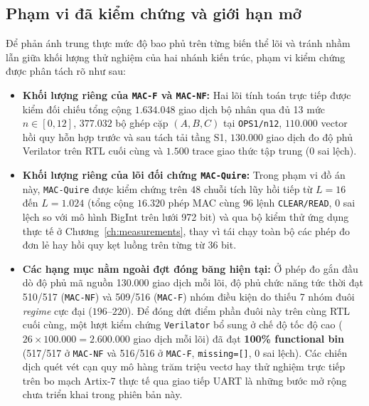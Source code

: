 \subsection{Phạm vi đã kiểm chứng và giới hạn mở}
Để phản ánh trung thực mức độ bao phủ trên từng biến thể lõi và tránh nhầm lẫn
giữa khối lượng thử nghiệm của hai nhánh kiến trúc, phạm vi kiểm chứng được phân
tách rõ như sau:
\begin{itemize}
  \item \textbf{Khối lượng riêng của \texttt{MAC-F} và \texttt{MAC-NF}:} Hai lõi
        tính toán trực tiếp được kiểm đối chiếu tổng cộng $1.634.048$ giao dịch bộ
        nhân qua đủ 13 mức $n \in [0, 12]$, $377.032$ bộ ghép cặp $(A,B,C)$ tại
        \texttt{OPS1/n12}, $110.000$ vector hồi quy hỗn hợp trước và sau tách tải
        tầng S1, $130.000$ giao dịch đo độ phủ Verilator trên RTL cuối cùng và
        $1.500$ trace giao thức tập trung ($0$ sai lệch).
  \item \textbf{Khối lượng riêng của lõi đối chứng \texttt{MAC-Quire}:} Trong phạm
        vi đồ án này, \texttt{MAC-Quire} được kiểm chứng trên $48$ chuỗi tích lũy
        hồi tiếp từ $L=16$ đến $L=1.024$ (tổng cộng $16.320$ phép MAC cùng $96$
        lệnh \texttt{CLEAR/READ}, $0$ sai lệch so với mô hình BigInt trên lưới
        972 bit) và qua bộ kiểm thử ứng dụng thực tế ở Chương~\ref{ch:measurements},
        thay vì tái chạy toàn bộ các phép đo đơn lẻ hay hồi quy kẹt luồng trên từng từ 36 bit.
  \item \textbf{Các hạng mục nằm ngoài đợt đóng băng hiện tại:} Ở phép đo gắn đầu dò
        độ phủ mã nguồn 130.000 giao dịch mỗi lõi, độ phủ chức năng tức thời đạt
        510/517 (\texttt{MAC-NF}) và 509/516 (\texttt{MAC-F}) nhóm điều kiện
        do thiếu 7 nhóm đuôi \textit{regime} cực đại ($196\text{--}220$). Để đóng
        dứt điểm phần đuôi này trên cùng RTL cuối cùng, một lượt kiểm chứng
        \texttt{Verilator} bổ sung ở chế độ tốc độ cao ($26 \times 100.000
        = 2.600.000$ giao dịch mỗi lõi) đã đạt \textbf{100\% functional bin}
        (517/517 ở \texttt{MAC-NF} và 516/516 ở \texttt{MAC-F},
        \texttt{missing=[]}, $0$ sai lệch). Các chiến dịch quét vét cạn quy mô
        hàng trăm triệu vectơ hay thử nghiệm trực tiếp trên bo mạch Artix-7 thực tế
        qua giao tiếp UART là những bước mở rộng chưa triển khai trong phiên bản này.
\end{itemize}


